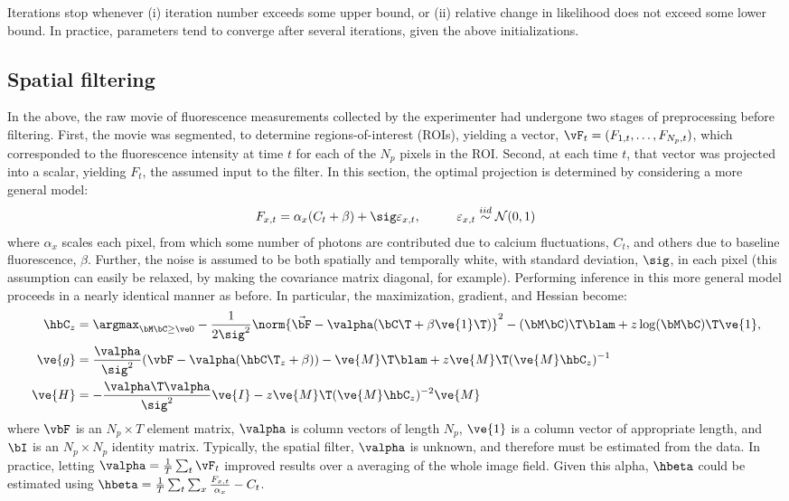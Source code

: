 Iterations stop whenever (i) iteration number exceeds some upper bound, or (ii) relative change in likelihood does not exceed some lower bound.  In practice, parameters tend to converge after several iterations, given the above initializations. 


\subsection{Spatial filtering} \label{sec:methods:spatial}

In the above, the raw movie of fluorescence measurements collected by the experimenter had undergone two stages of preprocessing before filtering.  First, the movie was segmented, to determine regions-of-interest (ROIs), yielding a vector, $\vF_t=(F_{1,t}, \ldots, F_{N_p,t})$, which corresponded to the fluorescence intensity at time $t$ for each of the $N_p$ pixels in the ROI.  Second, at each time $t$, that vector was projected into a scalar, yielding $F_t$, the assumed input to the filter.  In this section, the optimal projection is determined by considering a more general model:
\begin{align} \label{eq:bF}
F_{x,t} &= \alpha_x (C_t + \beta) +  \sig \varepsilon_{x,t}, \qquad &\varepsilon_{x,t} \overset{iid}{\sim} \mathcal{N}(0,1)   
\end{align}
\noindent where $\alpha_x$ scales each pixel, from which some number of photons are contributed due to calcium fluctuations, $C_t$, and others due to baseline fluorescence, $\beta$.  Further, the noise is assumed to be both spatially and temporally white, with standard deviation, $\sig$, in each pixel (this assumption can easily be relaxed, by making the covariance matrix diagonal, for example).  Performing inference in this more general model proceeds in a  nearly identical manner as before. In particular, the maximization, gradient, and Hessian become:
\begin{align} 
\hbC_{\zzz} 
&= \az  -\frac{1}{2 \sig^2} \norm{\vec{\bF} - \valpha (\bC\T +\beta\ve{1}\T)}^2 - (\bM \bC )\T \blam  + \zzz \log(\bM \bC)\T\ve{1},  \label{eq:eta4}\\
\ve{g} &= \frac{\valpha}{\sig^2}(\vbF -\valpha({\hbC\T}_{\zzz} + \beta)) - \ve{M}\T\blam + \zzz \ve{M}\T (\ve{M} \hbC_{\zzz})^{-1} \label{eq:g2} \\
\ve{H} &= -\frac{\valpha\T \valpha}{\sig^2} \ve{I} - \zzz \ve{M}\T (\ve{M} \hbC_{\zzz})^{-2} \ve{M} \label{eq:H2}
\end{align}
\noindent where $\vbF$ is an $N_p \times T$ element matrix, $\valpha$ is column vectors of length $N_p$, $\ve{1}$ is  a column vector of appropriate length, and $\bI$ is an $N_p \times N_p$ identity matrix.  Typically, the spatial filter, $\valpha$ is unknown, and therefore must be estimated from the data.  In practice, letting $\valpha=\frac{1}{T}\sum_t \vF_t$ improved results over a \naive averaging of the whole image field.  Given this alpha, $\hbeta$ could be estimated using $\hbeta=\frac{1}{T}\sum_t \sum_x \frac{F_{x,t}}{\alpha_x} - C_t$.




